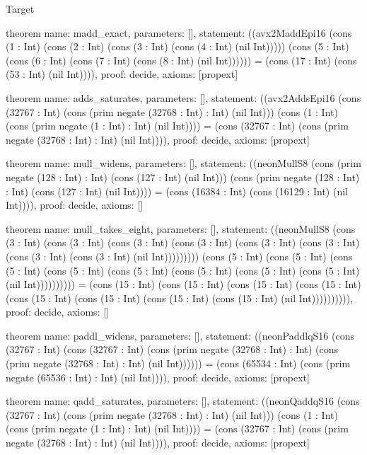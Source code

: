 \begin{lexlean}{Target}
\begin{semanticmodule}
theorem{
  name: madd_exact,
  parameters: [],
  statement: ((avx2MaddEpi16 (cons (1 : Int) (cons (2 : Int) (cons (3 : Int) (cons (4 : Int) (nil Int))))) (cons (5 : Int) (cons (6 : Int) (cons (7 : Int) (cons (8 : Int) (nil Int)))))) = (cons (17 : Int) (cons (53 : Int) (nil Int)))),
  proof: decide{},
  axioms: [propext]
}

theorem{
  name: adds_saturates,
  parameters: [],
  statement: ((avx2AddsEpi16 (cons (32767 : Int) (cons (prim negate (32768 : Int) : Int) (nil Int))) (cons (1 : Int) (cons (prim negate (1 : Int) : Int) (nil Int)))) = (cons (32767 : Int) (cons (prim negate (32768 : Int) : Int) (nil Int)))),
  proof: decide{},
  axioms: [propext]
}

theorem{
  name: mull_widens,
  parameters: [],
  statement: ((neonMullS8 (cons (prim negate (128 : Int) : Int) (cons (127 : Int) (nil Int))) (cons (prim negate (128 : Int) : Int) (cons (127 : Int) (nil Int)))) = (cons (16384 : Int) (cons (16129 : Int) (nil Int)))),
  proof: decide{},
  axioms: []
}

theorem{
  name: mull_takes_eight,
  parameters: [],
  statement: ((neonMullS8 (cons (3 : Int) (cons (3 : Int) (cons (3 : Int) (cons (3 : Int) (cons (3 : Int) (cons (3 : Int) (cons (3 : Int) (cons (3 : Int) (nil Int))))))))) (cons (5 : Int) (cons (5 : Int) (cons (5 : Int) (cons (5 : Int) (cons (5 : Int) (cons (5 : Int) (cons (5 : Int) (cons (5 : Int) (nil Int)))))))))) = (cons (15 : Int) (cons (15 : Int) (cons (15 : Int) (cons (15 : Int) (cons (15 : Int) (cons (15 : Int) (cons (15 : Int) (cons (15 : Int) (nil Int)))))))))),
  proof: decide{},
  axioms: []
}

theorem{
  name: paddl_widens,
  parameters: [],
  statement: ((neonPaddlqS16 (cons (32767 : Int) (cons (32767 : Int) (cons (prim negate (32768 : Int) : Int) (cons (prim negate (32768 : Int) : Int) (nil Int)))))) = (cons (65534 : Int) (cons (prim negate (65536 : Int) : Int) (nil Int)))),
  proof: decide{},
  axioms: [propext]
}

theorem{
  name: qadd_saturates,
  parameters: [],
  statement: ((neonQaddqS16 (cons (32767 : Int) (cons (prim negate (32768 : Int) : Int) (nil Int))) (cons (1 : Int) (cons (prim negate (1 : Int) : Int) (nil Int)))) = (cons (32767 : Int) (cons (prim negate (32768 : Int) : Int) (nil Int)))),
  proof: decide{},
  axioms: [propext]
}


\end{semanticmodule}
\end{lexlean}
